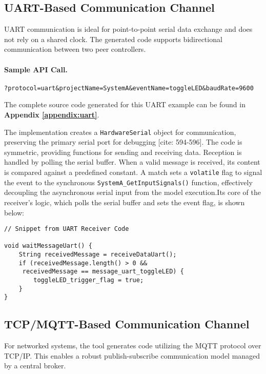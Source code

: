 \subsection{UART-Based Communication Channel}
\label{subsec:uart_analysis}
UART communication is ideal for point-to-point serial data exchange and does not rely on a shared clock. The generated code supports bidirectional communication between two peer controllers.

\paragraph{Sample API Call.}
\begin{verbatim}
?protocol=uart&projectName=SystemA&eventName=toggleLED&baudRate=9600
\end{verbatim}

The complete source code generated for this UART example can be found in \textbf{Appendix \ref{appendix:uart}}.


The implementation creates a \texttt{HardwareSerial} object for communication, preserving the primary serial port for debugging [cite: 594-596]. The code is symmetric, providing functions for sending and receiving data. Reception is handled by polling the serial buffer. When a valid message is received, its content is compared against a predefined constant. A match sets a \texttt{volatile} flag to signal the event to the synchronous \texttt{SystemA\_GetInputSignals()} function, effectively decoupling the asynchronous serial input from the model execution.Its core of the receiver's logic, which polls the serial buffer and sets the event flag, is shown below:

\begin{verbatim}
// Snippet from UART Receiver Code

void waitMessageUart() {
    String receivedMessage = receiveDataUart();
    if (receivedMessage.length() > 0 &&
     receivedMessage == message_uart_toggleLED) {
        toggleLED_trigger_flag = true;
    }
}
\end{verbatim}

\subsection{TCP/MQTT-Based Communication Channel}
\label{subsec:tcp_analysis}
For networked systems, the tool generates code utilizing the MQTT protocol over TCP/IP. This enables a robust publish-subscribe communication model managed by a central broker.

